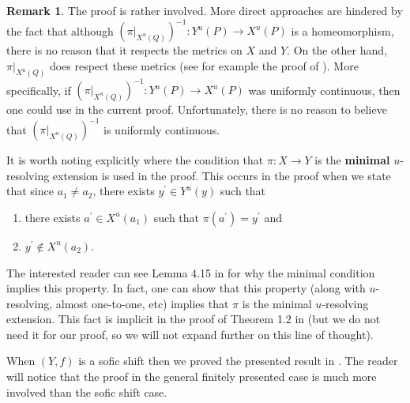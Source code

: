 \documentclass{amsart}
\theoremstyle{plain}
\theoremstyle{definition}
\newtheorem{remark}[theorem]{Remark}
\theoremstyle{remark}
\begin{document}
\begin{remark}
The proof is rather involved. More direct approaches are hindered by the fact that although $(\pi|_{X^u(Q)})^{-1}: Y^u(P) \rightarrow X^u(P)$ is a homeomorphism, there is no reason that it respects the metrics on $X$ and $Y$. On the other hand, $\pi|_{X^u(Q)}$ does respect these metrics (see for example the proof of \cite[Lemma 6.5]{DeeSto}). More specifically, if $(\pi|_{X^u(Q)})^{-1}: Y^u(P) \rightarrow X^u(P)$ was uniformly continuous, then one could use \cite[Proposition 4.2]{thomsen2010c} in the current proof. Unfortunately, there is no reason to believe that $(\pi|_{X^u(Q)})^{-1}$ is uniformly continuous.

It is worth noting explicitly where the condition that $\pi: X \rightarrow Y$ is the {\bf minimal} $u$-resolving extension is used in the proof. This occurs in the proof when we state that since $a_1 \neq a_2$, there exists $y^{\prime} \in Y^u(y)$ such that 
\begin{enumerate}
\item there exists $a^{\prime} \in X^u(a_1)$ such that $\pi(a^{\prime})=y^{\prime}$ and
\item $y^{\prime} \not\in X^u(a_2)$.
\end{enumerate}
The interested reader can see Lemma 4.15 in \cite{fisher13} for why the minimal condition implies this property. In fact, one can show that this property (along with $u$-resolving, almost one-to-one, etc) implies that $\pi$ is the minimal $u$-resolving extension. This fact is implicit in the proof of Theorem 1.2 in \cite{fisher13} (but we do not need it for our proof, so we will not expand further on this line of thought).

When $(Y, f)$ is a sofic shift then we proved the presented result in \cite[Theorem 4.6]{DeeStoShift}. The reader will notice that the proof in the general finitely presented case is much more involved than the sofic shift case.
\end{remark}
\end{document}

